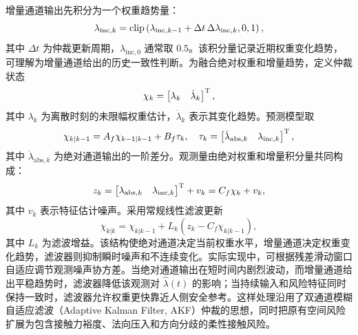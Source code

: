 增量通道输出先积分为一个权重趋势量：
\begin{equation}
  \lambda_{\mathrm{inc},k}=
  \operatorname{clip}\left(
  \lambda_{\mathrm{inc},k-1}
  +\Delta t\,\Delta\lambda_{\mathrm{inc},k},
  0,1
  \right),
  \label{eq:ch4_inc_integration}
\end{equation}
其中 $\Delta t$ 为仲裁更新周期，$\lambda_{\mathrm{inc},0}$ 通常取 $0.5$。该积分量记录近期权重变化趋势，可理解为增量通道给出的历史一致性判断。为融合绝对权重和增量趋势，定义仲裁状态
\begin{equation}
  \chi_k=
  \begin{bmatrix}
    \lambda_k & \dot\lambda_k
  \end{bmatrix}^{\mathrm{T}},
  \label{eq:ch4_arbitration_state}
\end{equation}
其中 $\lambda_k$ 为离散时刻的未限幅权重估计，$\dot\lambda_k$ 表示其变化趋势。预测模型取
\begin{equation}
  \chi_{k|k-1}=A_f\chi_{k-1|k-1}+B_f\tau_k,
  \quad
  \tau_k=
  \begin{bmatrix}
    \dot\lambda_{\mathrm{abs},k} & \lambda_{\mathrm{inc},k}
  \end{bmatrix}^{\mathrm{T}},
  \label{eq:ch4_filter_predict}
\end{equation}
其中 $\dot\lambda_{\mathrm{abs},k}$ 为绝对通道输出的一阶差分。观测量由绝对权重和增量积分量共同构成：
\begin{equation}
  z_k=
  \begin{bmatrix}
    \lambda_{\mathrm{abs},k} & \lambda_{\mathrm{inc},k}
  \end{bmatrix}^{\mathrm{T}}
  +v_k
  =C_f\chi_k+v_k,
  \label{eq:ch4_filter_measure}
\end{equation}
其中 $v_k$ 表示特征估计噪声。采用常规线性滤波更新
\begin{equation}
  \chi_{k|k}=\chi_{k|k-1}
  +L_k\left(z_k-C_f\chi_{k|k-1}\right),
  \label{eq:ch4_filter_update}
\end{equation}
其中 $L_k$ 为滤波增益。该结构使绝对通道决定当前权重水平，增量通道决定权重变化趋势，滤波器则抑制瞬时噪声和不连续变化。实际实现中，可根据残差滑动窗口自适应调节观测噪声协方差。当绝对通道输出在短时间内剧烈波动，而增量通道给出平稳趋势时，滤波器降低该观测对 $\hat\lambda(t)$ 的影响；当持续输入和风险特征同时保持一致时，滤波器允许权重更快靠近人侧安全参考。这样处理沿用了双通道模糊自适应滤波（Adaptive Kalman Filter, AKF）仲裁的思想，同时把原有空间风险扩展为包含接触力裕度、法向压入和方向分歧的柔性接触风险。

